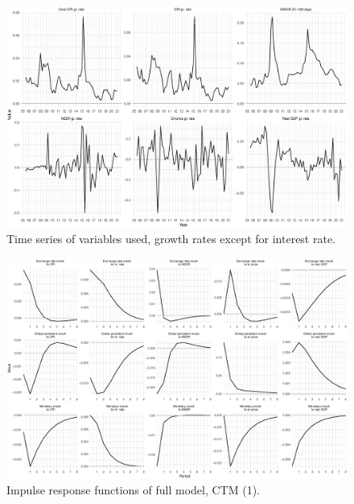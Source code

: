 \documentclass{beamer}
\begin{document}
\begin{frame}[noframenumbering]
	\label{time_series}
	\begin{figure}[h!]
		\centering
		\includegraphics[width=1\linewidth]{../Text/figures/time_series}
		\caption[]{Time series of variables used, growth rates except for interest rate.}
		\label{fig:time_series}
	\end{figure}
\end{frame}

\begin{frame}[noframenumbering]
	\label{fullirfs}
	\begin{figure}[h!]
		\centering
		\includegraphics[width=1\linewidth]{../Text/figures/irf_1}
		\caption[]{Impulse response functions of full model, CTM (1).}
		\label{fig:irf_1}
	\end{figure}
 
\end{frame}
\end{document}
